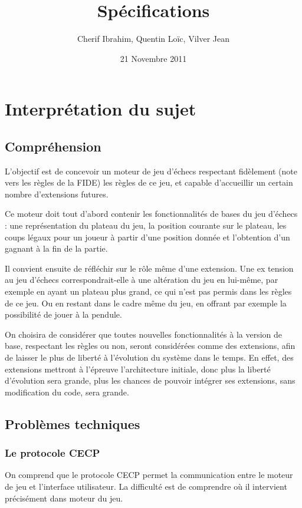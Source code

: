 \documentclass[11pt]{article}
\title{Spécifications}
\author{Cherif Ibrahim, Quentin Loïc, Vilver Jean}
\date{21 Novembre 2011}
\begin{document}
\maketitle

\setcounter{tocdepth}{3}
\tableofcontents
\vspace*{1cm}

\section{Interprétation du sujet}
\label{sec-1}
\subsection{Compréhension}
\label{sec-1-1}
L'objectif est de concevoir un moteur de jeu d'échecs respectant fidèlement (note vers les règles de la FIDE) les règles de ce jeu, et capable d'accueillir un certain nombre d'extensions futures.

Ce moteur doit tout d'abord contenir les fonctionnalités de bases du jeu d'échecs : une représentation du plateau du jeu, la position courante sur le plateau, les coups légaux pour un joueur à partir d'une position donnée et l'obtention d'un gagnant à la fin de la partie.
   
Il convient ensuite de réfléchir sur le rôle même d'une extension. Une ex tension au jeu d'échecs correspondrait-elle à une altération du jeu en lui-même, par exemple en ayant un plateau plus grand, ce qui n'est pas permis dans les règles de ce jeu. Ou en restant dans le cadre même du jeu, en offrant par exemple la possibilité de jouer à la pendule.
   
On choisira de considérer que toutes nouvelles fonctionnalités à la version de base, respectant les règles ou non, seront considérées comme des extensions, afin de laisser le plus de liberté à l'évolution du système dans le temps. 
En effet, des extensions mettront à l'épreuve l'architecture initiale, donc plus la liberté d'évolution sera grande, plus les chances de pouvoir intégrer ses extensions, sans modification du code, sera grande.
\subsection{Problèmes techniques}
\label{sec-1-2}
\subsubsection{Le protocole CECP}
\label{sec-1-2-1}
On comprend que le protocole CECP permet la communication entre le moteur de jeu et l'interface utilisateur. La difficulté est de comprendre où il intervient précisément dans moteur du jeu.
\end{document}
